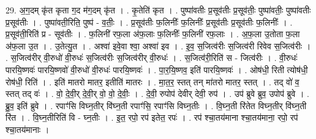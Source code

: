 \documentclass[17pt]{extarticle}
\begin{document}
29. अ॒ग॒दम् कृ॑त कृता ग॒द म॑ग॒दम् कृ॑त । . कृ॒तेति॑ कृत । . पुष्पा॑वतीः प्र॒सूव॑तीः प्र॒सूव॑तीः॒ पुष्पा॑वतीः॒ पुष्पा॑वतीः प्र॒सूव॑तीः । . पुष्पा॑वती॒रिति॒ पुष्प॑ - व॒तीः॒ । . प्र॒सूव॑तीः फ॒लिनीः᳚ फ॒लिनीः᳚ प्र॒सूव॑तीः प्र॒सूव॑तीः फ॒लिनीः᳚ । . प्र॒सूव॑ती॒रिति॑ प्र - सूव॑तीः । . फ॒लिनी॑ रफ॒ला अ॑फ॒लाः फ॒लिनीः᳚ फ॒लिनी॑ रफ॒लाः । . अ॒फ॒ला उ॒तोता फ॒ला अ॑फ॒ला उ॒त । . उ॒तेत्यु॒त । . अश्वा॑ इवे॒वा श्वा॒ अश्वा॑ इव । . इ॒व॒ स॒जित्व॑रीः स॒जित्व॑री रिवेव स॒जित्व॑रीः । . स॒जित्व॑रीर् वी॒रुधो॑ वी॒रुधः॑ स॒जित्व॑रीः स॒जित्व॑रीर् वी॒रुधः॑ । . स॒जित्व॑री॒रिति॑ स - जित्व॑रीः । . वी॒रुधः॑ पारयि॒ष्णवः॑ पारयि॒ष्णवो॑ वी॒रुधो॑ वी॒रुधः॑ पारयि॒ष्णवः॑ । . पा॒र॒यि॒ष्णव॒ इति॑ पारयि॒ष्णवः॑ । . ओष॑धी॒ रिती त्योष॑धी॒ रोष॑धी॒ रिति॑ । . इति॑ मातरो मातर॒ इतीति॑ मातरः । . मा॒त॒र॒ स्तत् तन् मा॑तरो मातर॒ स्तत् । . तद् वो॑ व॒ स्तत् तद् वः॑ । . वो॒ दे॒वी॒र् दे॒वी॒र् वो॒ वो॒ दे॒वीः॒ । . दे॒वी॒ रुपोप॑ देवीर् देवी॒ रुप॑ । . उप॑ ब्रुवे ब्रुव॒ उपोप॑ ब्रुवे । . ब्रु॒व॒ इति॑ ब्रुवे । . रपाꣳ॑सि विघ्न॒तीर् वि॑घ्न॒ती रपाꣳ॑सि॒ रपाꣳ॑सि विघ्न॒तीः । . वि॒घ्न॒ती रि॑तेत विघ्न॒तीर् वि॑घ्न॒ती रि॑त । . वि॒घ्न॒तीरिति॑ वि - घ्न॒तीः । . इ॒त॒ रपो॒ रप॑ इतेत॒ रपः॑ । . रप॑ श्चा॒तय॑माना श्चा॒तय॑माना॒ रपो॒ रप॑ श्चा॒तय॑मानाः । \newline
\end{document}
